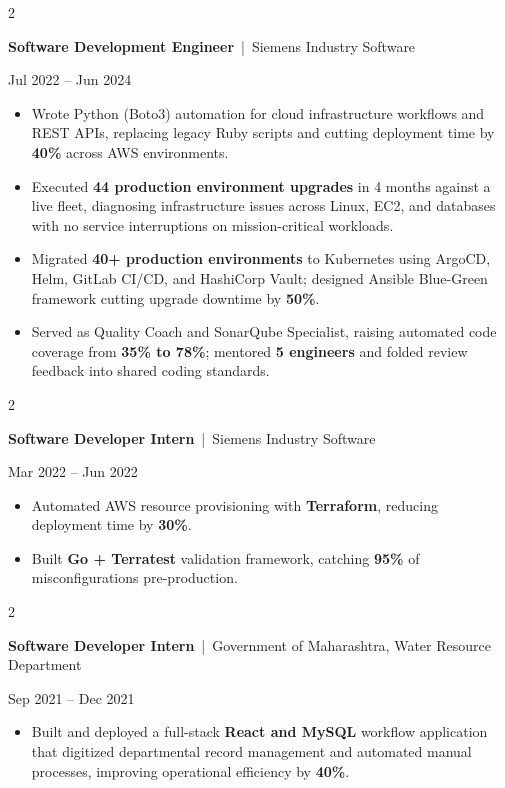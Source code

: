 \documentclass[10pt, letterpaper]{article}
\newenvironment{highlights}{
    \begin{itemize}[
        topsep=0.10 cm,
        parsep=0.06 cm,
        partopsep=0pt,
        itemsep=0.06 cm,
        leftmargin=12pt
    ]
}{
    \end{itemize}
}
\newenvironment{twocolentry}[2][]{
    \onecolentry
    \def\secondColumn{#2}
    \setcolumnwidth{\fill, 4.5 cm}
    \begin{paracol}{2}
}{
    \switchcolumn \raggedleft \secondColumn
    \end{paracol}
    \endonecolentry
}
\begin{document}
\vspace{0.15 cm}

\begin{twocolentry}{Jul 2022 -- Jun 2024}
\textbf{Software Development Engineer} \,|\, Siemens Industry Software
\end{twocolentry}
\begin{highlights}
  \item Wrote Python (Boto3) automation for cloud infrastructure workflows and REST APIs, replacing legacy Ruby scripts and cutting deployment time by \textbf{40\%} across AWS environments.
  \item Executed \textbf{44 production environment upgrades} in 4 months against a live fleet, diagnosing infrastructure issues across Linux, EC2, and databases with no service interruptions on mission-critical workloads.
  \item Migrated \textbf{40+ production environments} to Kubernetes using ArgoCD, Helm, GitLab CI/CD, and HashiCorp Vault; designed Ansible Blue-Green framework cutting upgrade downtime by \textbf{50\%}.
  \item Served as Quality Coach and SonarQube Specialist, raising automated code coverage from \textbf{35\% to 78\%}; mentored \textbf{5 engineers} and folded review feedback into shared coding standards.
\end{highlights}

\vspace{0.15 cm}

\begin{twocolentry}{Mar 2022 -- Jun 2022}
\textbf{Software Developer Intern} \,|\, Siemens Industry Software
\end{twocolentry}
\begin{highlights}
  \item Automated AWS resource provisioning with \textbf{Terraform}, reducing deployment time by \textbf{30\%}.
  \item Built \textbf{Go + Terratest} validation framework, catching \textbf{95\%} of misconfigurations pre-production.
\end{highlights}

\vspace{0.15 cm}

\begin{twocolentry}{Sep 2021 -- Dec 2021}
\textbf{Software Developer Intern} \,|\, Government of Maharashtra, Water Resource Department
\end{twocolentry}
\begin{highlights}
  \item Built and deployed a full-stack \textbf{React and MySQL} workflow application that digitized departmental record management and automated manual processes, improving operational efficiency by \textbf{40\%}.
\end{highlights}
\end{document}
